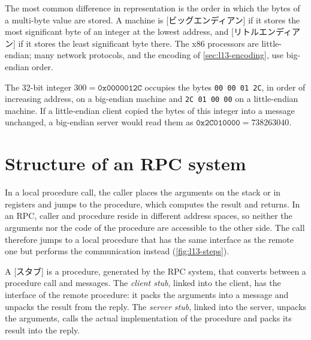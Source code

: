 \documentclass[../main.tex]{subfiles}
\begin{document}
The most common difference in representation is the order in which the
bytes of a multi-byte value are stored.  A machine is
[ビッグエンディアン] if it stores the most significant byte
of an integer at the lowest address, and
[リトルエンディアン] if it stores the least significant
byte there.  The x86 processors are little-endian; many network protocols,
and the encoding of \cref{sec:l13-encoding}, use big-endian order.

\begin{example}
  \label{ex:l13-endian}
  The 32-bit integer $300 = \mathtt{0x0000012C}$ occupies the bytes
  \texttt{00 00 01 2C}, in order of increasing address, on a big-endian
  machine and \texttt{2C 01 00 00} on a little-endian machine.  If a
  little-endian client copied the bytes of this integer into a message
  unchanged, a big-endian server would read them as
  $\mathtt{0x2C010000} = \num{738263040}$.
\end{example}

\section{Structure of an RPC system}
\label{sec:l13-structure}

In a local procedure call, the caller places the arguments on the stack or
in registers and jumps to the procedure, which computes the result and
returns.  In an RPC, caller and procedure reside in
different address spaces, so neither the arguments nor the code of the
procedure are accessible to the other side.  The call therefore jumps to a
local procedure that has the same interface as the remote one but performs
the communication instead (\cref{fig:l13-steps}).

\begin{definition}[Stub]
  A [スタブ] is a procedure, generated by the RPC system, that
  converts between a procedure call and messages.  The \emph{client stub},
  linked into the client, has the interface of the remote procedure: it
  packs the arguments into a message and unpacks the result from the reply.
  The \emph{server stub}, linked into the server, unpacks the arguments,
  calls the actual implementation of the procedure and packs its result
  into the reply.
\end{definition}
\end{document}
